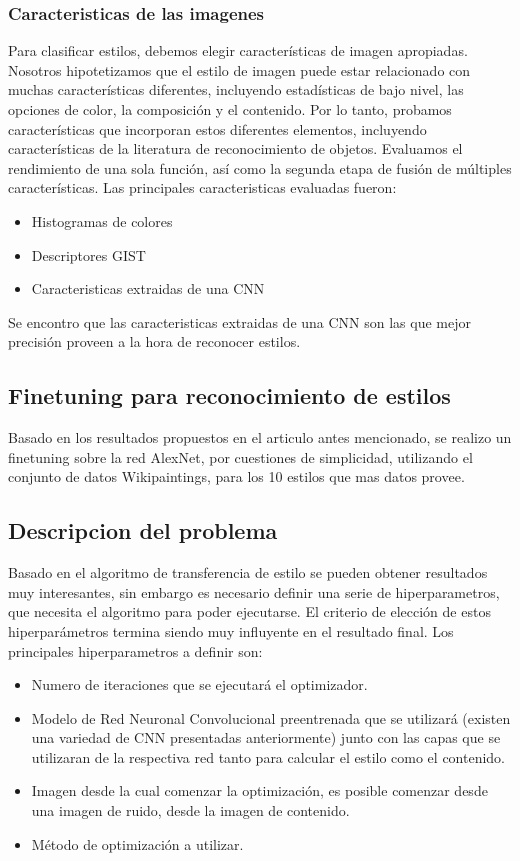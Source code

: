 \documentclass[a4paper,10pt]{article}
\begin{document}
    \subsubsection{Caracteristicas de las imagenes}
	Para clasificar estilos, debemos elegir características de imagen apropiadas. Nosotros hipotetizamos que el estilo de imagen puede estar relacionado con muchas características diferentes, 
	incluyendo estadísticas de bajo nivel, las opciones de color, la composición y el contenido. Por lo tanto, probamos características que incorporan estos diferentes elementos, incluyendo características de la 
	literatura de reconocimiento de objetos. Evaluamos el rendimiento de una sola función, así como la segunda etapa de fusión de múltiples características.
	Las principales caracteristicas evaluadas fueron:
	\begin{itemize}
	 \item Histogramas de colores
	 \item Descriptores GIST
	 \item Caracteristicas extraidas de una CNN
	\end{itemize}
	Se encontro que las caracteristicas extraidas de una CNN son las que mejor precisión proveen a la hora de reconocer estilos.

  \subsection{Finetuning para reconocimiento de estilos}
    Basado en los resultados propuestos en el articulo antes mencionado, se realizo un finetuning sobre la red AlexNet, por cuestiones de simplicidad, utilizando
    el conjunto de datos Wikipaintings, para los 10 estilos que mas datos provee.

    
  \subsection{Descripcion del problema}
    Basado en el algoritmo de transferencia de estilo se pueden obtener resultados muy interesantes, sin embargo es necesario definir una serie de hiperparametros,
    que necesita el algoritmo para poder ejecutarse. El criterio de elección de estos hiperparámetros termina siendo muy influyente en el resultado final. 
    Los principales hiperparametros a definir son:
    \begin{itemize}
      \item Numero de iteraciones que se ejecutará el optimizador.
      \item Modelo de Red Neuronal Convolucional preentrenada que se utilizará (existen una variedad de CNN presentadas anteriormente) junto con las capas que se utilizaran de la 
      respectiva red tanto para calcular el estilo como el contenido.
      \item Imagen desde la cual comenzar la optimización, es posible comenzar desde una imagen de ruido, desde la imagen de contenido.
      \item Método de optimización a utilizar.
    \end{itemize}
\end{document}
